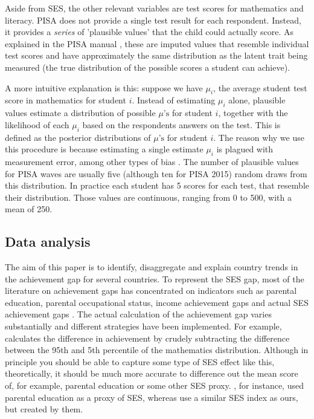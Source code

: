 \documentclass[11pt, a4paper]{article}\usepackage[]{graphicx}\usepackage[]{color}
\begin{document}
Aside from SES, the other relevant variables are test scores for mathematics and literacy. PISA does not provide a single test result for each respondent. Instead, it provides a \emph{series} of 'plausible values' that the child could actually score. As explained in the PISA manual \citep{pisa2012_technical}, these are imputed values that resemble individual test scores and have approximately the same distribution as the latent trait being measured (the true distribution of the possible scores a student can achieve). 

A more intuitive explanation is this: suppose we have \(\mu_i\), the average student test score in mathematics for student \(i\). Instead of estimating \(\mu_i\) alone, plausible values estimate a distribution of possible \(\mu\text{'s}\) for student \(i\), together with the likelihood of each \(\mu_i\) based on the respondents answers on the test. This is defined as the posterior distributions of \(\mu\text{'s}\) for student \(i\). The reason why we use this procedure is because estimating a single estimate \(\mu_i\) is plagued with measurement error, among other types of bias \citep[see][]{wu2005}. The number of plausible values for PISA waves are usually five (although ten for PISA 2015) random draws from this distribution. In practice each student has 5 scores for each test, that resemble their distribution. Those values are continuous, ranging from 0 to 500, with a mean of 250.

\subsection{Data analysis}

The aim of this paper is to identify, disaggregate and explain country trends in the achievement gap for several countries. To represent the SES gap, most of the literature on achievement gaps has concentrated on indicators such as parental education, parental occupational status, income achievement gaps and actual SES achievement gaps \citep{fryer2004, hanushek_woesmann_tracking, saw2016, bradbury2015, byun2010}. The actual calculation of the achievement gap varies substantially and different strategies have been implemented. For example, \citet{micklewright} calculates the difference in achievement by crudely subtracting the difference between the 95th and 5th percentile of the mathematics distribution. Although in principle you should be able to capture some type of SES effect like this, theoretically, it should be much more accurate to difference out the mean score of, for example, parental education or some other SES proxy. \citet{saw2016}, for instance, used parental education as a proxy of SES, whereas \citet{byun2010} use a similar SES index as ours, but created by them.
\end{document}
